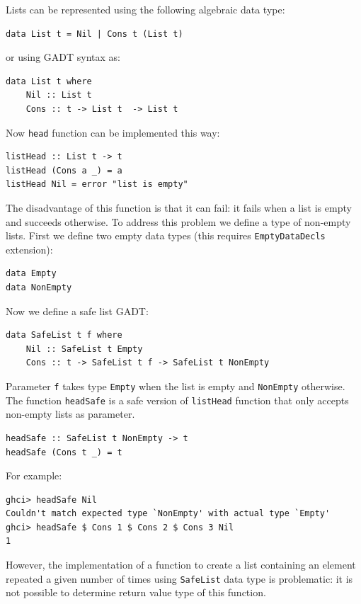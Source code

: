 \documentclass{tmr}
\begin{document}
Lists can be represented using the following algebraic data type:

\begin{Verbatim}
data List t = Nil | Cons t (List t)
\end{Verbatim}

or using GADT syntax as:

\begin{Verbatim}
data List t where
    Nil :: List t
    Cons :: t -> List t  -> List t 
\end{Verbatim}

Now \verb|head| function can be implemented this way:

\begin{Verbatim}
listHead :: List t -> t
listHead (Cons a _) = a
listHead Nil = error "list is empty"
\end{Verbatim}

The disadvantage of this function is that it can fail: it fails when a list is empty and succeeds otherwise. To address this problem we define a type of non-empty lists. First we define two empty data types (this requires \verb|EmptyDataDecls| extension):

\begin{Verbatim}
data Empty
data NonEmpty
\end{Verbatim}

Now we define a safe list GADT:

\begin{Verbatim}
data SafeList t f where
    Nil :: SafeList t Empty
    Cons :: t -> SafeList t f -> SafeList t NonEmpty
\end{Verbatim}

Parameter \verb|f| takes type \verb|Empty| when the list is empty and \verb|NonEmpty| otherwise. The function \verb|headSafe| is a safe version of \verb|listHead| function that only accepts non-empty lists as parameter.

\begin{Verbatim}
headSafe :: SafeList t NonEmpty -> t
headSafe (Cons t _) = t
\end{Verbatim}

For example:

\begin{Verbatim}
ghci> headSafe Nil
Couldn't match expected type `NonEmpty' with actual type `Empty'
ghci> headSafe $ Cons 1 $ Cons 2 $ Cons 3 Nil
1
\end{Verbatim}

However, the implementation of a function to create a list containing an element repeated a given number of times using \verb|SafeList| data type is problematic: it is not possible to determine return value type of this function.
\end{document}
